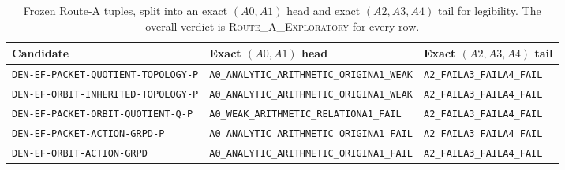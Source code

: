 \documentclass[11pt]{article}
\theoremstyle{definition}
\newcommand{\EXPL}{\textsc{Route\_A\_Exploratory}}
\begin{document}
\begin{table}[htbp]
\centering\scriptsize
\caption{Frozen Route-A tuples, split into an exact \((A0,A1)\) head and exact \((A2,A3,A4)\) tail for legibility.  The overall verdict is \EXPL{} for every row.}\label{tab:routes}
\begin{tabularx}{\textwidth}{P{0.36\textwidth}P{0.36\textwidth}Y}
\toprule
Candidate & Exact \((A0,A1)\) head & Exact \((A2,A3,A4)\) tail \\
\midrule
\texttt{DEN-EF-PACKET-}\newline\texttt{QUOTIENT-TOPOLOGY-P} & \texttt{A0\_ANALYTIC\_}\newline\texttt{ARITHMETIC\_ORIGIN}\newline\texttt{A1\_WEAK} & \texttt{A2\_FAIL}\newline\texttt{A3\_FAIL}\newline\texttt{A4\_FAIL}\\
\texttt{DEN-EF-ORBIT-INHERITED-}\newline\texttt{TOPOLOGY-P} & \texttt{A0\_ANALYTIC\_}\newline\texttt{ARITHMETIC\_ORIGIN}\newline\texttt{A1\_WEAK} & \texttt{A2\_FAIL}\newline\texttt{A3\_FAIL}\newline\texttt{A4\_FAIL}\\
\texttt{DEN-EF-PACKET-ORBIT-}\newline\texttt{QUOTIENT-Q-P} & \texttt{A0\_WEAK\_ARITHMETIC\_}\newline\texttt{RELATION}\newline\texttt{A1\_FAIL} & \texttt{A2\_FAIL}\newline\texttt{A3\_FAIL}\newline\texttt{A4\_FAIL}\\
\texttt{DEN-EF-PACKET-}\newline\texttt{ACTION-GRPD-P} & \texttt{A0\_ANALYTIC\_}\newline\texttt{ARITHMETIC\_ORIGIN}\newline\texttt{A1\_FAIL} & \texttt{A2\_FAIL}\newline\texttt{A3\_FAIL}\newline\texttt{A4\_FAIL}\\
\texttt{DEN-EF-ORBIT-}\newline\texttt{ACTION-GRPD} & \texttt{A0\_ANALYTIC\_}\newline\texttt{ARITHMETIC\_ORIGIN}\newline\texttt{A1\_FAIL} & \texttt{A2\_FAIL}\newline\texttt{A3\_FAIL}\newline\texttt{A4\_FAIL}\\

\end{tabularx}
\end{table}
\end{document}
